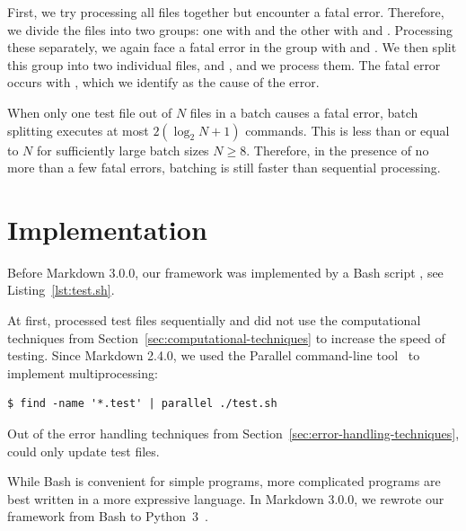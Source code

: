 \documentclass[final]{ltugboat}
\begin{document}
\medskip
\noindent
\begingroup
\centering

\par
\endgroup

\medskip
\noindent
First, we try processing all files together but encounter a fatal error. Therefore, we divide the files into two groups: one with  and the other with  and . Processing these separately, we again face a fatal error in the group with  and . We then split this group into two individual files,  and , and we process them. The fatal error occurs with , which we identify as the cause of the error.

When only one test file out of $N$ files in a batch causes a fatal error, batch splitting executes at most $2 (\log_2 N + 1)$ commands. This is less than or equal to $N$ for sufficiently large batch sizes $N\geq 8$. Therefore, in the presence of no more than a few fatal errors, batching is still faster than sequential processing.

\smallskip
\noindent
\begingroup
\centering

\par
\endgroup

\section{Implementation}
\label{sec:implementation}

Before Markdown 3.0.0, our framework was implemented by a Bash script , see Listing~\ref{lst:test.sh}.

At first,  processed test files sequentially and did not use the computational techniques from Section~\ref{sec:computational-techniques} to increase the speed of testing. Since Markdown 2.4.0, we used the  Parallel command-line tool~\cite{tange2011gnu} to implement multiprocessing:
\begin{verbatim}
$ find -name '*.test' | parallel ./test.sh
\end{verbatim}
Out of the error handling techniques from Section~\ref{sec:error-handling-techniques},  could only update test files.

While Bash is convenient for simple programs, more complicated programs are best written in a more expressive language. In Markdown 3.0.0, we rewrote our framework from Bash to Python~3~\cite{novotny2023implement}.
\end{document}
